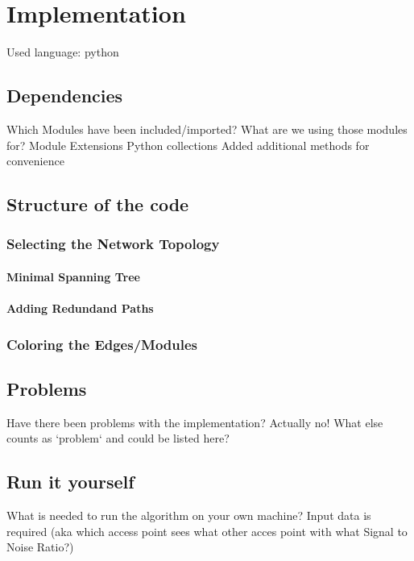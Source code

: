 \chapter{Implementation}
  Used language: python\newline
\section{Dependencies}
  Which Modules have been included/imported?\newline
  What are we using those modules for?\newline
  Module Extensions\newline
    Python collections\newline
      Added additional methods for convenience
\section{Structure of the code}
  \subsection{Selecting the Network Topology}
    \subsubsection{Minimal Spanning Tree}
    \subsubsection{Adding Redundand Paths}
  \subsection{Coloring the Edges/Modules}
\section{Problems}
  Have there been problems with the implementation?\newline
    Actually no! \newline
  What else counts as `problem` and could be listed here?\newline
\section{Run it yourself}
  What is needed to run the algorithm on your own machine?\newline
    Input data is required (aka which access point sees what other acces point with what Signal to Noise Ratio?) \newline
    
